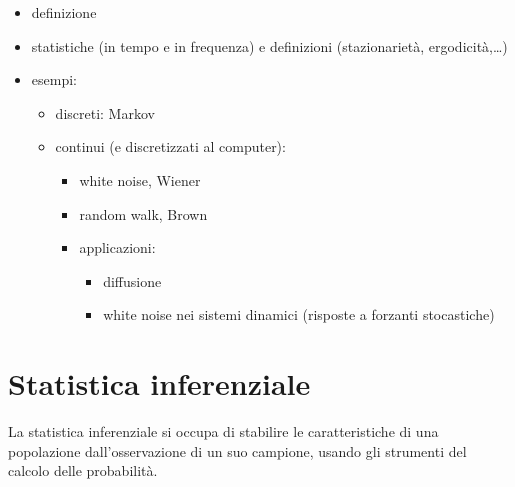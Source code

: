 \documentclass[letterpaper,10pt,italian]{jupyterBook}
\begin{document}
\sphinxAtStartPar
{}
\begin{itemize}
\item {} 
\sphinxAtStartPar
definizione

\item {} 
\sphinxAtStartPar
statistiche (in tempo e in frequenza) e definizioni (stazionarietà, ergodicità,…)

\item {} 
\sphinxAtStartPar
esempi:
\begin{itemize}
\item {} 
\sphinxAtStartPar
discreti: Markov

\item {} 
\sphinxAtStartPar
continui (e discretizzati al computer):
\begin{itemize}
\item {} 
\sphinxAtStartPar
white noise, Wiener

\item {} 
\sphinxAtStartPar
random walk, Brown

\item {} 
\sphinxAtStartPar
applicazioni:
\begin{itemize}
\item {} 
\sphinxAtStartPar
diffusione

\item {} 
\sphinxAtStartPar
white noise nei sistemi dinamici (risposte a forzanti stocastiche)

\end{itemize}

\end{itemize}

\end{itemize}

\end{itemize}

\sphinxstepscope


\chapter{Statistica inferenziale}
\label{\detokenize{ch/statistics/inference:statistica-inferenziale}}\label{\detokenize{ch/statistics/inference:statistics-hs-inference}}\label{\detokenize{ch/statistics/inference::doc}}
\sphinxAtStartPar
La statistica inferenziale si occupa di stabilire le caratteristiche di una popolazione dall’osservazione di un suo campione, usando gli strumenti del calcolo delle probabilità.
\end{document}

